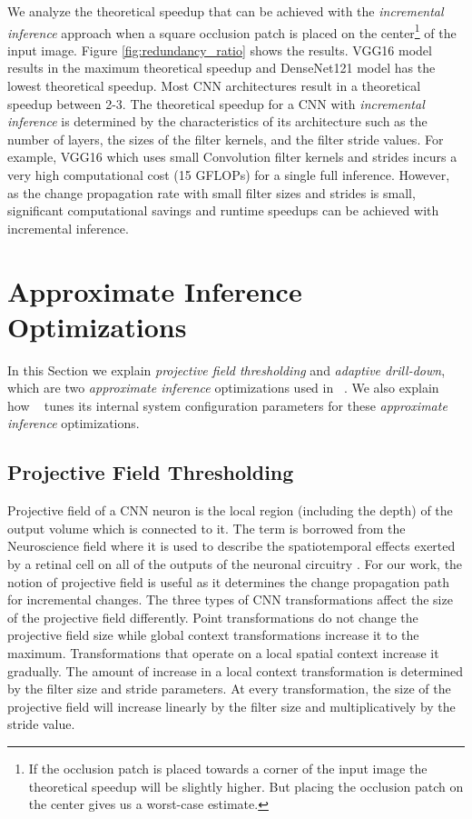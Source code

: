 We analyze the theoretical speedup that can be achieved with the \textit{incremental inference} approach when a square occlusion patch is placed on the center\footnote{If the occlusion patch is placed towards a corner of the input image the theoretical speedup will be slightly higher.
But placing the occlusion patch on the center gives us a worst-case estimate.} of the input image.
Figure \ref{fig:redundancy_ratio} shows the results.
VGG16 model results in the maximum theoretical speedup and DenseNet121 model has the lowest theoretical speedup.
Most CNN architectures result in a theoretical speedup between 2-3.
The theoretical speedup for a CNN with \textit{incremental inference} is determined by the characteristics of its architecture such as the number of layers, the sizes of the filter kernels, and the filter stride values.
For example, VGG16 which uses small Convolution filter kernels and strides incurs a very high computational cost (15 GFLOPs) for a single full inference.
However, as the change propagation rate with small filter sizes and strides is small, significant computational savings and runtime speedups can be achieved with incremental inference.


\section{Approximate Inference Optimizations}\label{sec:approx}
In this Section we explain \textit{projective field thresholding} and \textit{adaptive drill-down}, which are two \textit{approximate inference} optimizations used in ~\system.
We also explain how \system~ tunes its internal system configuration parameters for these \textit{approximate inference} optimizations.


\subsection{Projective Field Thresholding}
Projective field \cite{le2017receptive, basiccnnoperations} of a CNN neuron is the local region (including the depth) of the output volume which is connected to it.
The term is borrowed from the Neuroscience field where it is used to describe the spatiotemporal effects exerted by a retinal cell on all of the outputs of the neuronal circuitry \cite{de2011projective}.
For our work, the notion of projective field is useful as it determines the change propagation path for incremental changes.
The three types of CNN transformations affect the size of the projective field differently.
Point transformations do not change the projective field size while global context transformations increase it to the maximum.
Transformations that operate on a local spatial context increase it gradually.
The amount of increase in a local context transformation is determined by the filter size and stride parameters.
At every transformation, the size of the projective field will increase linearly by the filter size and multiplicatively by the stride value.

